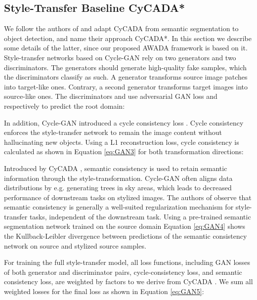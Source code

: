 \documentclass[10pt,twocolumn,letterpaper]{article}
\begin{document}
\subsection{Style-Transfer Baseline CyCADA*}
We follow the authors of \cite{menke2022} and adapt CyCADA \cite{CyCADA} from semantic segmentation to object detection, and name their approach CyCADA*. In this section we describe some details of the latter, since our proposed AWADA framework is based on it.\\
Style-transfer networks based on Cycle-GAN \cite{CycleGAN} rely on two generators and two discriminators. The generators should generate high-quality fake samples, which the discriminators classify as such. A generator  transforms source image patches into target-like ones. Contrary, a second generator  transforms target images into source-like ones. The discriminators  and  use adversarial GAN loss  and  respectively to predict the root domain:



In addition, Cycle-GAN \cite{CycleGAN} introduced a cycle consistency loss . Cycle consistency enforces the style-transfer network to remain the image content without hallucinating new objects. Using a L1 reconstruction loss, cycle consistency is calculated as shown in Equation \ref{eq:GAN3} for both transformation directions:



Introduced by CyCADA \cite{CyCADA}, semantic consistency is used to retain semantic information through the style-transformation. Cycle-GAN often aligns data distributions by e.g. generating trees in sky areas, which leads to decreased performance of downstream tasks on stylized images. The authors of \cite{menke2022} observe that semantic consistency is generally a well-suited regularization mechanism for style-transfer tasks, independent of the downstream task. Using a pre-trained semantic segmentation network  trained on the source domain Equation \ref{eq:GAN4} shows the Kullback-Leibler divergence between predictions of the semantic consistency network on source and stylized source samples. 



For training the full style-transfer model, all loss functions, including GAN losses of both generator and discriminator pairs, cycle-consistency loss, and semantic consistency loss, are weighted by factors  to  we derive from CyCADA \cite{CyCADA}. We sum all weighted losses for the final loss as shown in Equation \ref{eq:GAN5}:
\end{document}
